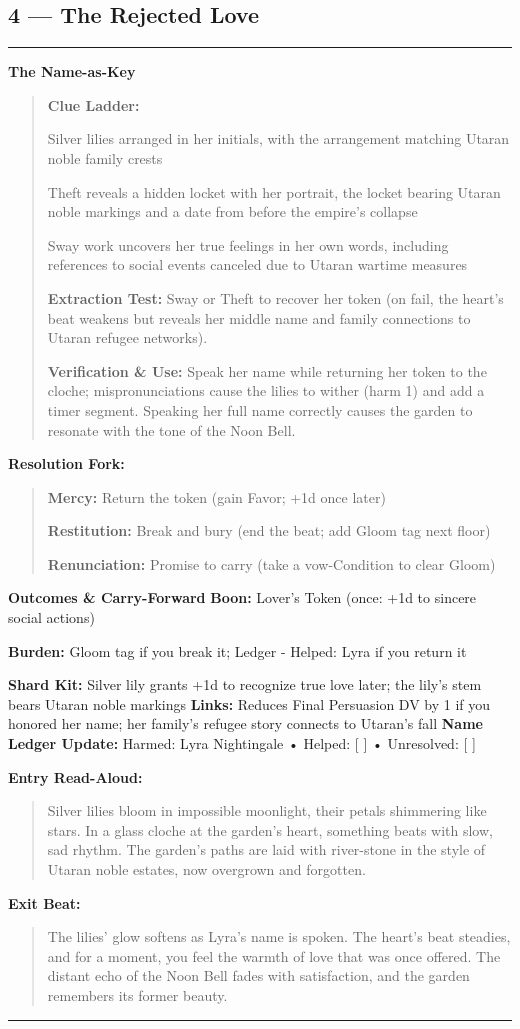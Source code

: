 \documentclass[18pt, letterpaper, twoside]{article}
\newenvironment{floorbox}[1]{%
    \begin{center}
    \begin{minipage}{0.95\textwidth}
    \subsection*{#1}
    \vspace{-0.5em}
    \rule{\textwidth}{0.5pt}
    \vspace{0.5em}
}{%
    \vspace{0.5em}
    \rule{\textwidth}{0.5pt}
    \end{minipage}
    \end{center}
}
\newenvironment{gmnote}[1]{%
    \vspace{0.5em}
    \noindent\textbf{#1}
    \begin{quote}
}{%
    \end{quote}
    \vspace{0.5em}
}
\newenvironment{resolutionbox}{%
    \vspace{0.5em}
    \noindent\textbf{Resolution Fork:}
    \begin{quote}
}{%
    \end{quote}
    \vspace{0.5em}
}
\newenvironment{boxedtext}[1]{%
    \vspace{0.5em}
    \noindent\textbf{#1}
    \begin{quote}
}{%
    \end{quote}
    \vspace{0.5em}
}
\newcommand{\boon}[1]{\noindent\textbf{Boon:} #1\par}
\newcommand{\burden}[1]{\noindent\textbf{Burden:} #1\par}
\newcommand{\entrytext}[1]{\begin{boxedtext}{Entry Read-Aloud:} #1 \end{boxedtext}}
\newcommand{\exittext}[1]{\begin{boxedtext}{Exit Beat:} #1 \end{boxedtext}}
\begin{document}
\begin{floorbox}{4 --- The Rejected Love}
\begin{gmnote}{The Name-as-Key}
\textbf{Clue Ladder:}
\begin{description}[leftmargin=*, style=unboxed]
    \item[Gentle Nudge:] Silver lilies arranged in her initials, with the arrangement matching Utaran noble family crests
    \item[Actionable Lead:] Theft reveals a hidden locket with her portrait, the locket bearing Utaran noble markings and a date from before the empire's collapse
    \item[Aha! Proof:] Sway work uncovers her true feelings in her own words, including references to social events canceled due to Utaran wartime measures
\end{description}

\textbf{Extraction Test:} Sway or Theft to recover her token (on fail, the heart's beat weakens but reveals her middle name and family connections to Utaran refugee networks).

\textbf{Verification \& Use:} Speak her name while returning her token to the cloche; mispronunciations cause the lilies to wither (harm 1) and add a timer segment. Speaking her full name correctly causes the garden to resonate with the tone of the Noon Bell.
\end{gmnote}

\begin{resolutionbox}
\textbf{Mercy:} Return the token (gain Favor; +1d once later)

\textbf{Restitution:} Break and bury (end the beat; add Gloom tag next floor)

\textbf{Renunciation:} Promise to carry (take a vow-Condition to clear Gloom)
\end{resolutionbox}

\textbf{Outcomes \& Carry-Forward}
\boon{Lover's Token (once: +1d to sincere social actions)}
\burden{Gloom tag if you break it; Ledger - Helped: Lyra if you return it}
\textbf{Shard Kit:} Silver lily grants +1d to recognize true love later; the lily's stem bears Utaran noble markings
\textbf{Links:} Reduces Final Persuasion DV by 1 if you honored her name; her family's refugee story connects to Utaran's fall
\textbf{Name Ledger Update:} Harmed: Lyra Nightingale • Helped: [ ] • Unresolved: [ ]

\entrytext{Silver lilies bloom in impossible moonlight, their petals shimmering like stars. In a glass cloche at the garden's heart, something beats with slow, sad rhythm. The garden's paths are laid with river-stone in the style of Utaran noble estates, now overgrown and forgotten.}

\exittext{The lilies' glow softens as Lyra's name is spoken. The heart's beat steadies, and for a moment, you feel the warmth of love that was once offered. The distant echo of the Noon Bell fades with satisfaction, and the garden remembers its former beauty.}
\end{floorbox}
\end{document}
